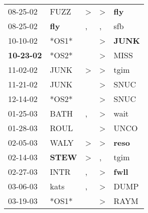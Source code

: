 \begin{supertabular}{p{0.07\textwidth}p{0.06\textwidth}p{0.02\textwidth}p{0.02\textwidth}p{0.06\textwidth}}
          08-25-02\textsuperscript{} &           FUZZ\textsuperscript{} &     \textgreater &     \textgreater &   \textbf{fly\textsuperscript{}} \\
          08-25-02\textsuperscript{} &   \textbf{fly\textsuperscript{}} &                , &                , &            sfb\textsuperscript{} \\
          10-10-02\textsuperscript{} &                            *OS1* &                  &     \textgreater &  \textbf{JUNK\textsuperscript{}} \\
 \textbf{10-23-02\textsuperscript{}} &                            *OS2* &                  &     \textgreater &           MISS\textsuperscript{} \\
          11-02-02\textsuperscript{} &           JUNK\textsuperscript{} &     \textgreater &     \textgreater &           tgim\textsuperscript{} \\
          11-21-02\textsuperscript{} &           JUNK\textsuperscript{} &                  &     \textgreater &           SNUC\textsuperscript{} \\
          12-14-02\textsuperscript{} &                            *OS2* &                  &     \textgreater &           SNUC\textsuperscript{} \\
          01-25-03\textsuperscript{} &           BATH\textsuperscript{} &                , &     \textgreater &           wait\textsuperscript{} \\
          01-28-03\textsuperscript{} &           ROUL\textsuperscript{} &                  &     \textgreater &           UNCO\textsuperscript{} \\
          02-05-03\textsuperscript{} &           WALY\textsuperscript{} &     \textgreater &     \textgreater &  \textbf{reso\textsuperscript{}} \\
          02-14-03\textsuperscript{} &  \textbf{STEW\textsuperscript{}} &     \textgreater &                , &           tgim\textsuperscript{} \\
          02-27-03\textsuperscript{} &           INTR\textsuperscript{} &                , &     \textgreater &  \textbf{fwll\textsuperscript{}} \\
          03-06-03\textsuperscript{} &           kats\textsuperscript{} &                , &     \textgreater &           DUMP\textsuperscript{} \\
          03-19-03\textsuperscript{} &                            *OS1* &                  &     \textgreater &           RAYM\textsuperscript{} \\

\end{supertabular}
